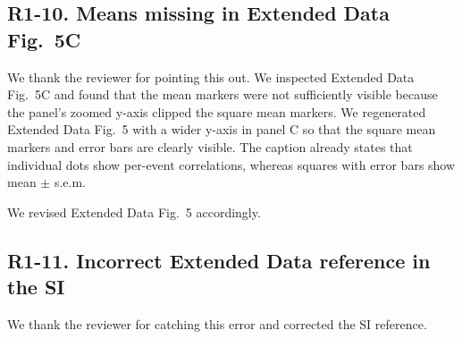 \subsection*{R1-10. Means missing in Extended Data Fig.~5C}


\responselabel
We thank the reviewer for pointing this out. We inspected Extended Data Fig.~5C and found that the mean markers were not sufficiently visible because the panel's zoomed y-axis clipped the square mean markers. We regenerated Extended Data Fig.~5 with a wider y-axis in panel C so that the square mean markers and error bars are clearly visible. The caption already states that individual dots show per-event correlations, whereas squares with error bars show mean $\pm$ s.e.m.

We revised Extended Data Fig.~5 accordingly.


\subsection*{R1-11. Incorrect Extended Data reference in the SI}


\responselabel
We thank the reviewer for catching this error and corrected the SI reference.
